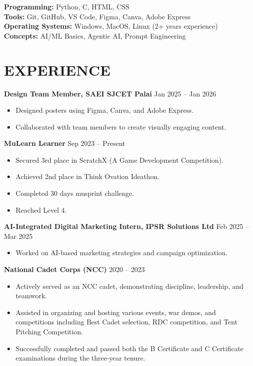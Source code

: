 \documentclass[10pt]{article}
\begin{document}
\textbf{Programming:} Python, C, HTML, CSS \\
\textbf{Tools:} Git, GitHub, VS Code, Figma, Canva, Adobe Express \\
\textbf{Operating Systems:} Windows, MacOS, Linux (2+ years experience) \\
\textbf{Concepts:} AI/ML Basics, Agentic AI, Prompt Engineering



\section*{EXPERIENCE}

\textbf{Design Team Member, SAEI SJCET Palai} \hfill Jan 2025 -- Jan 2026
\begin{itemize}
    \item Designed posters using Figma, Canva, and Adobe Express.
    \item Collaborated with team members to create visually engaging content.
\end{itemize}

\textbf{MuLearn Learner} \hfill Sep 2023 -- Present
\begin{itemize}
    \item Secured 3rd place in ScratchX (A Game Development Competition).
    \item Achieved 2nd place in Think Ovation Ideathon.
    \item Completed  30 days musprint challenge.
    \item Reached Level 4.
\end{itemize}

\textbf{AI-Integrated Digital Marketing Intern, IPSR Solutions Ltd} \hfill Feb 2025 -- Mar 2025
\begin{itemize}
    \item Worked on AI-based marketing strategies and campaign optimization.
\end{itemize}

\textbf{National Cadet Corps (NCC)} \hfill 2020 -- 2023
\begin{itemize}
    \item Actively served as an NCC cadet, demonstrating discipline, leadership, and teamwork.
    \item Assisted in organizing and hosting various events, war demos, and competitions including Best Cadet selection, RDC competition, and Tent Pitching Competition.
    \item Successfully completed and passed both the B Certificate and C Certificate examinations during the three-year tenure.
\end{itemize}
\end{document}
